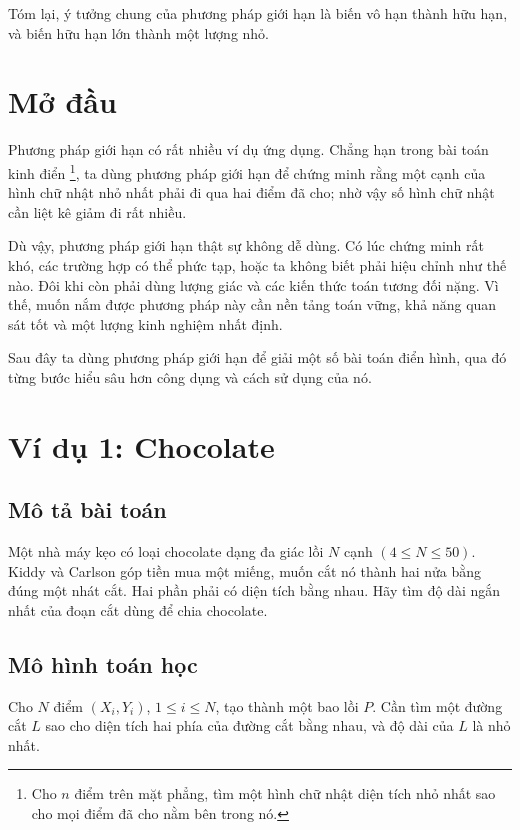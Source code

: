 \documentclass[11pt]{article}
\begin{document}
Tóm lại, ý tưởng chung của phương pháp giới hạn là biến vô hạn thành hữu hạn,
và biến hữu hạn lớn thành một lượng nhỏ.

\section{Mở đầu}

Phương pháp giới hạn có rất nhiều ví dụ ứng dụng. Chẳng hạn trong bài toán
kinh điển \footnote{Cho \(n\) điểm trên mặt
phẳng, tìm một hình chữ nhật diện tích nhỏ nhất sao cho mọi điểm đã cho nằm
bên trong nó.}, ta dùng phương pháp giới hạn để chứng minh rằng một cạnh của
hình chữ nhật nhỏ nhất phải đi qua hai điểm đã cho; nhờ vậy số hình chữ nhật
cần liệt kê giảm đi rất nhiều.

Dù vậy, phương pháp giới hạn thật sự không dễ dùng. Có lúc chứng minh rất khó,
các trường hợp có thể phức tạp, hoặc ta không biết phải hiệu chỉnh như thế nào.
Đôi khi còn phải dùng lượng giác và các kiến thức toán tương đối nặng. Vì thế,
muốn nắm được phương pháp này cần nền tảng toán vững, khả năng quan sát tốt và
một lượng kinh nghiệm nhất định.

Sau đây ta dùng phương pháp giới hạn để giải một số bài toán điển hình, qua đó
từng bước hiểu sâu hơn công dụng và cách sử dụng của nó.

\section{Ví dụ 1: Chocolate}

\subsection*{Mô tả bài toán}

Một nhà máy kẹo có loại chocolate dạng đa giác lồi \(N\) cạnh
\((4\le N\le 50)\). Kiddy và Carlson góp tiền mua một miếng, muốn cắt nó thành
hai nửa bằng đúng một nhát cắt. Hai phần phải có diện tích bằng nhau. Hãy tìm
độ dài ngắn nhất của đoạn cắt dùng để chia chocolate.

\subsection*{Mô hình toán học}

Cho \(N\) điểm \((X_i,Y_i)\), \(1\le i\le N\), tạo thành một bao lồi \(P\).
Cần tìm một đường cắt \(L\) sao cho diện tích hai phía của đường cắt bằng nhau,
và độ dài của \(L\) là nhỏ nhất.
\end{document}
